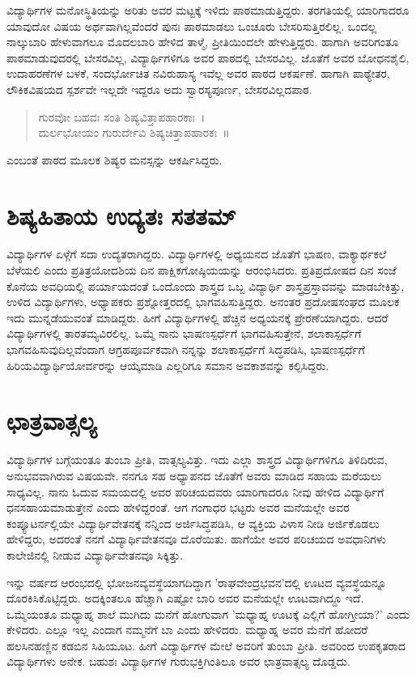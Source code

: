 ವಿದ್ಯಾರ್ಥಿಗಳ ಮನೋಸ್ಥಿತಿಯನ್ನು ಅರಿತು ಅವರ ಮಟ್ಟಕ್ಕೆ ಇಳಿದು ಪಾಠಮಾಡುತ್ತಿದ್ದರು. ತರಗತಿಯಲ್ಲಿ ಯಾರಿಗಾದರೂ ಯಾವುದೋ ವಿಷಯ ಅರ್ಥವಾಗಿಲ್ಲವೆಂದರೆ ಪುನಃ ಪಾಠಮಾಡಲು ಒಂಚೂರು ಬೇಸರಿಸುತ್ತಿರಲಿಲ್ಲ. ಒಂದಲ್ಲ ನಾಲ್ಕುಬಾರಿ ಹೇಳುವಾಗಲೂ ಮೊದಲಬಾರಿ ಹೇಳಿದ ತಾಳ್ಮೆ, ಪ್ರೀತಿಯಿಂದಲೇ ಹೇಳುತ್ತಿದ್ದರು. ಹಾಗಾಗಿ ಅವರಿಗಂತೂ ಪಾಠಮಾಡುವುದರಲ್ಲಿ ಬೇಸರವಿಲ್ಲ, ವಿದ್ಯಾರ್ಥಿಗಳಿಗೂ ಅವರ ಪಾಠದಲ್ಲಿ ಬೇಸರವಿಲ್ಲ. ಜೊತೆಗೆ ಅವರ ಬೋಧನಶೈಲಿ, ಉದಾಹರಣೆಗಳ ಬಳಕೆ, ಸಂದರ್ಭೋಚಿತ ನವಿರುಹಾಸ್ಯ ಇವೆಲ್ಲ ಅವರ ಪಾಠದ ಆಕರ್ಷಣೆ. ಹಾಗಾಗಿ ಪಾಠ್ಯೇತರ, ಲೌಕಿಕವಿಷಯದ ಸ್ಪರ್ಶವೇ ಇಲ್ಲದೇ ಇದ್ದರೂ ಅದು ಸ್ವಾರಸ್ಯಪೂರ್ಣ, ಬೇಸರವಿಲ್ಲದಪಾಠ.
\begin{verse}
ಗುರವೋ ಬಹವಃ ಸಂತಿ ಶಿಷ್ಯವಿತ್ತಾಪಹಾರಕಾಃ~।\\
ದುರ್ಲಭೋಯಂ ಗುರುರ್ದೇವಿ ಶಿಷ್ಯಚಿತ್ತಾಪಹಾರಕಃ~॥
\end{verse}
ಎಂಬಂತೆ ಪಾಠದ ಮೂಲಕ ಶಿಷ್ಯರ ಮನಸ್ಸನ್ನು ಆಕರ್ಷಿಸಿದ್ದರು.

\section*{ಶಿಷ್ಯಹಿತಾಯ ಉದ್ಯತಃ ಸತತಮ್}

ವಿದ್ಯಾರ್ಥಿಗಳ ಏಳ್ಗೆಗೆ ಸದಾ ಉದ್ಯತರಾಗಿದ್ದರು. ವಿದ್ಯಾರ್ಥಿಗಳಲ್ಲಿ ಅಧ್ಯಯನದ ಜೊತೆಗೆ ಭಾಷಣ, ವಾಕ್ಯಾರ್ಥಕಲೆ ಬೆಳೆಯಲಿ ಎಂದು ಪ್ರತಿತ್ರಯೋದಶಿಯ ದಿನ ಪಾಕ್ಷಿಕಗೋಷ್ಠಿಯಯನ್ನು ಆರಂಭಿಸಿದರು. ಪ್ರತಿಪ್ರದೋಷದ ದಿನ ಸಂಜೆ ಕೊನೆಯ ಅವಧಿಯಲ್ಲಿ ಪರ್ಯಾಯದಂತೆ ಒಂದೊಂದು ಶಾಸ್ತ್ರದ ಒಬ್ಬ ವಿದ್ಯಾರ್ಥಿ ಶಾಸ್ತ್ರಪ್ರಸ್ತಾವವನ್ನು ಮಾಡಬೇಕಿತ್ತು, ಉಳಿದ ವಿದ್ಯಾರ್ಥಿಗಳು, ಅಧ್ಯಾಪಕರು ಪ್ರಶ್ನೋತ್ತರದಲ್ಲಿ ಭಾಗವಹಿಸುತ್ತಿದ್ದರು. ಅನಂತರ ಪ್ರದೋಷಸಂಘದ ಮೂಲಕ ಇದು ಮುನ್ನಡೆಯುವಂತೆ ಮಾಡಿದ್ದರು. ಹೀಗೆ ವಿದ್ಯಾರ್ಥಿಗಳಲ್ಲಿ ಹೆಚ್ಚಿನ ಅಧ್ಯಯನಕ್ಕೆ ಪ್ರೇರಣೆಯಾಗಿದ್ದರು. ಆದರೆ ವಿದ್ಯಾರ್ಥಿಗಳಲ್ಲಿ ತಾರತಮ್ಯವಿರಲಿಲ್ಲ. ಒಮ್ಮೆ ನಾನು ಭಾಷಣಸ್ಪರ್ಧೆಗೆ ಭಾಗವಹಿಸುತ್ತೇನೆ, ಶಲಾಕಾಸ್ಪರ್ಧೆಗೆ ಭಾಗವಹಿಸುವುದಿಲ್ಲವೆಂದಾಗ ಆಗ್ರಹಪೂರ್ವಕವಾಗಿ ನನ್ನನ್ನು ಶಲಾಕಾಸ್ಪರ್ಧೆಗೆ ಸಿದ್ಧಪಡಿಸಿ, ಭಾಷಣಸ್ಪರ್ಧೆಗೆ ಹಿರಿಯವಿದ್ಯಾರ್ಥಿಯೋರ್ವರನ್ನು ಆಯ್ಕೆಮಾಡಿ ಎಲ್ಲರಿಗೂ ಸಮಾನ ಅವಕಾಶವನ್ನು ಕಲ್ಪಿಸಿದ್ದರು.

\section*{ಛಾತ್ರವಾತ್ಸಲ್ಯ}

ವಿದ್ಯಾರ್ಥಿಗಳ ಬಗ್ಗೆಯಂತೂ ತುಂಬಾ ಪ್ರೀತಿ, ವಾತ್ಸಲ್ಯವಿತ್ತು. ಇದು ಎಲ್ಲಾ ಶಾಸ್ತ್ರದ ವಿದ್ಯಾರ್ಥಿಗಳಿಗೂ ತಿಳಿದಿರುವ, ಅನುಭವವಾಗಿರುವ ವಿಷಯವೇ. ನನಗೂ ಸಹ ಅಧ್ಯಾಪನದ ಜೊತೆಗೆ ಅವರು ಮಾಡಿದ ಸಹಾಯ ಮರೆಯಲು ಸಾಧ್ಯವಿಲ್ಲ. ನಾನು ಓದುವ ಸಮಯದಲ್ಲಿ ಅವರ ಪರಿಚಯದವರು ಯಾರಿಗಾದರೂ ನೀವು ಹೇಳಿದ ವಿದ್ಯಾರ್ಥಿಗೆ ಧನಸಹಾಯಮಾಡುತ್ತೇನೆ ಎಂದು ಹೇಳಿದ್ದರಂತೆ. ಆಗ ಗಂಗಾಧರ ಭಟ್ಟರು ಅವರ ಮನೆಯಲ್ಲೇ ಅವರ ಕಂಪ್ಯೂಟರ್ನಲ್ಲಿಯೇ ವಿದ್ಯಾರ್ಥಿವೇತನಕ್ಕೆ ನನ್ನಿಂದ ಅರ್ಜಿಸಿದ್ಧಪಡಿಸಿ, ಆ ವ್ಯಕ್ತಿಯ ವಿಳಾಸ ನೀಡಿ ಅರ್ಜಿಕೊಡಲು ಹೇಳಿದ್ದರು, ಅದರಂತೆ ನನಗೆ ವಿದ್ಯಾರ್ಥಿವೇತನವೂ ದೊರೆಯಿತು. ಹಾಗೆಯೇ ಅವರ ಪರಿಚಯದ ಅವಧಾನಿಗಳು ಕಾಲೇಜಿನಲ್ಲಿ ನೀಡುವ ವಿದ್ಯಾರ್ಥಿವೇತನವೂ ಸಿಕ್ಕಿತ್ತು.

ಇನ್ನು ವರ್ಷದ ಆರಂಭದಲ್ಲಿ ಭೋಜನವ್ಯವಸ್ಥೆಯಾಗದಿದ್ದಾಗ ’ರಾಘವೇಂದ್ರಭವನ’ದಲ್ಲಿ ಊಟದ ವ್ಯವಸ್ಥೆಯನ್ನೂ ದೊರಕಿಸಿಕೊಟ್ಟಿದ್ದರು. ಅದಕ್ಕಿಂತಲೂ ಹೆಚ್ಚಾಗಿ ಎಷ್ಟೋ ಬಾರಿ ಅವರ ಮನೆಯಲ್ಲೇ ಊಟವಾಗಿದ್ದೂ ಇದೆ. ಒಮ್ಮೆಯಂತೂ ಮಧ್ಯಾಹ್ನ ಶಾಲೆ ಮುಗಿದು ಮನೆಗೆ ಹೋಗುವಾಗ ’ಮಧ್ಯಾಹ್ನ ಊಟಕ್ಕೆ ಎಲ್ಲಿಗೆ ಹೋಗ್ತೀಯಾ?’ ಎಂದು ಕೇಳಿದರು. ಎಲ್ಲೂ ಇಲ್ಲ ಎಂದಾಗ ನಮ್ಮನೆಗೆ ಬಾ ಎಂದು ಹೇಳಿದರು. ಮಧ್ಯಾಹ್ನ ಅವರ ಮೆನೆಗೆ ಹೋದರೆ ಹಲಸಿನಹಣ್ಣಿನ ಕಡಬಿನ ಸಿಹಿಯೂಟ. ಹೀಗೆ ವಿದ್ಯಾರ್ಥಿಗಳ ಮೇಲೆ ಅವರಿಗೆ ತುಂಬಾ ಪ್ರೀತಿ. ಅವರಿಂದ ಉಪಕೃತರಾದ ವಿದ್ಯಾರ್ಥಿಗಳು ಅನೇಕ. ಬಹುಶಃ ವಿದ್ಯಾರ್ಥಿಗಳ ಗುರುಭಕ್ತಿಗಿಂತಿಲೂ ಅವರ ಛಾತ್ರವಾತ್ಸಲ್ಯ ದೊಡ್ಡದು.

